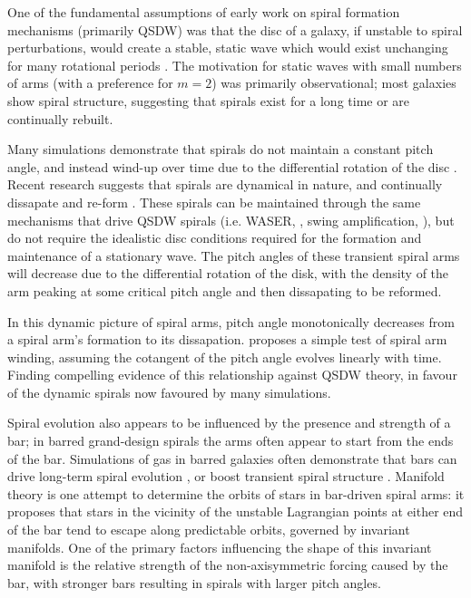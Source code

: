 One of the fundamental assumptions of early work on spiral formation mechanisms (primarily QSDW) was that the disc of a galaxy, if unstable to spiral perturbations, would create a stable, static wave which would exist unchanging for many rotational periods \citep{1964ApJ...140..646L}. The motivation for static waves with small numbers of arms (with a preference for $m=2$) was primarily observational; most galaxies show spiral structure, suggesting that spirals exist for a long time or are continually rebuilt.

Many simulations demonstrate that spirals do not maintain a constant pitch angle, and instead wind-up over time due to the differential rotation of the disc \citep{2013ApJ...763...46B}. Recent research suggests that spirals are dynamical in nature, and continually dissapate and re-form \citep{2014PASA...31...35D}. These spirals can be maintained through the same mechanisms that drive QSDW spirals (i.e. WASER, \citealt{1976ApJ...205..363M}, swing amplification, \citealt{1965MNRAS.130..125G}), but do not require the idealistic disc conditions required for the formation and maintenance of a stationary wave. The pitch angles of these transient spiral arms will decrease due to the differential rotation of the disk, with the density of the arm peaking at some critical pitch angle and then dissapating to be reformed.

In this dynamic picture of spiral arms, pitch angle monotonically decreases from a spiral arm's formation to its dissapation. \citet{2019arXiv190910291P} proposes a simple test of spiral arm winding, assuming the cotangent of the pitch angle evolves linearly with time. Finding compelling evidence of this relationship against QSDW theory, in favour of the dynamic spirals now favoured by many simulations.

Spiral evolution also appears to be influenced by the presence and strength of a bar; in barred grand-design spirals the arms often appear to start from the ends of the bar. Simulations of gas in barred galaxies often demonstrate that bars can drive long-term spiral evolution \citep{2008A&A...489..115R}, or boost transient spiral structure \citep{2012MNRAS.426..167G}. Manifold theory is one attempt to determine the orbits of stars in bar-driven spiral arms: it proposes that stars in the vicinity of the unstable Lagrangian points at either end of the bar tend to escape along predictable orbits, governed by invariant manifolds. One of the primary factors influencing the shape of this invariant manifold is the relative strength of the non-axisymmetric forcing caused by the bar, with stronger bars resulting in spirals with larger pitch angles.

